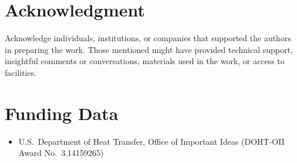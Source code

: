 \documentclass[largesc,upint,varvw,barcolor=Red4,nocopyright,hyphenate,balance,lang-second=french,lang=english]{asmejour}
\begin{document}
\section*{Acknowledgment} %

Acknowledge individuals, institutions, or companies that supported the authors in preparing the work. Those mentioned might have provided technical support, insightful comments or conversations, materials used in the work, or access to facilities.


\section*{Funding Data}
\begin{itemize}
\item U.S.\ Department of Heat Transfer, Office of Important Ideas (DOHT-OII Award No.\ 3.14159265)
\end{itemize}



\begin{nomenclature}





\end{nomenclature}



\end{document}
